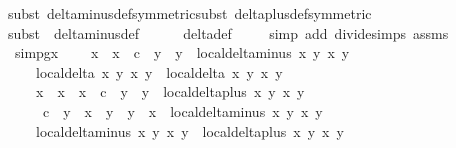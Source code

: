 \begin{isabellebody}
{\isacharparenleft}{\isacharparenleft}subst\ delta{\isacharunderscore}minus{\isacharunderscore}def{\isacharbrackleft}symmetric{\isacharbrackright}{\isacharparenright}{\isacharplus}{\isacharcomma}{\isacharparenleft}subst\ delta{\isacharunderscore}plus{\isacharunderscore}def{\isacharbrackleft}symmetric{\isacharbrackright}{\isacharparenright}{\isacharplus}{\isacharparenright}\isanewline
\ \ \ \ \isamarkupfalse%
{\isacharparenleft}subst\ {\isacharparenleft}{}{\isacharparenright}\ delta{\isacharunderscore}minus{\isacharunderscore}def{\isacharparenright}\isanewline
\ \ \ \ \isamarkupfalse%
\ delta{\isacharunderscore}def\isanewline
\ \ \ \ \isamarkupfalse%
{\isacharparenleft}simp\ add{\isacharcolon}\ divide{\isacharunderscore}simps\ assms{\isacharparenleft}{}{\isacharminus}{}{\isacharparenright}{\isacharparenright}\isanewline
\isanewline
\ \ \isamarkupfalse%
\ simp{}gx{\isacharcolon}\isanewline
\ \ \ \ {\isachardoublequoteopen}{\isacharparenleft}x{}\ {\isacharasterisk}\ x{}{\isacharprime}\ {\isacharminus}\ c\ {\isacharasterisk}\ y{}\ {\isacharasterisk}\ y{}{\isacharprime}{\isacharparenright}\ {\isacharasterisk}\ local{\isachardot}delta{\isacharunderscore}minus\ x{}{\isacharprime}\ y{}{\isacharprime}\ x{}\ y{}\ {\isacharasterisk}\isanewline
\ \ \ \ {\isacharparenleft}local{\isachardot}delta\ x{}\ y{}\ x{}\ y{}\ {\isacharasterisk}\ local{\isachardot}delta\ x{}\ y{}\ x{}\ y{}{\isacharparenright}\ {\isacharequal}\ \isanewline
\ \ \ \ {\isacharparenleft}x{}\ {\isacharasterisk}\ {\isacharparenleft}x{}\ {\isacharasterisk}\ x{}\ {\isacharminus}\ c\ {\isacharasterisk}\ y{}\ {\isacharasterisk}\ y{}{\isacharparenright}\ {\isacharasterisk}\ local{\isachardot}delta{\isacharunderscore}plus\ x{}\ y{}\ x{}\ y{}\ {\isacharminus}\isanewline
\ \ \ \ \ c\ {\isacharasterisk}\ y{}\ {\isacharasterisk}\ {\isacharparenleft}x{}\ {\isacharasterisk}\ y{}\ {\isacharplus}\ y{}\ {\isacharasterisk}\ x{}{\isacharparenright}\ {\isacharasterisk}\ local{\isachardot}delta{\isacharunderscore}minus\ x{}\ y{}\ x{}\ y{}{\isacharparenright}\ {\isacharasterisk}\isanewline
\ \ \ \ {\isacharparenleft}local{\isachardot}delta{\isacharunderscore}minus\ x{}\ y{}\ x{}\ y{}\ {\isacharasterisk}\ local{\isachardot}delta{\isacharunderscore}plus\ x{}\ y{}\ x{}\ y{}\ {\isacharminus}\isanewline

\end{isabellebody}
